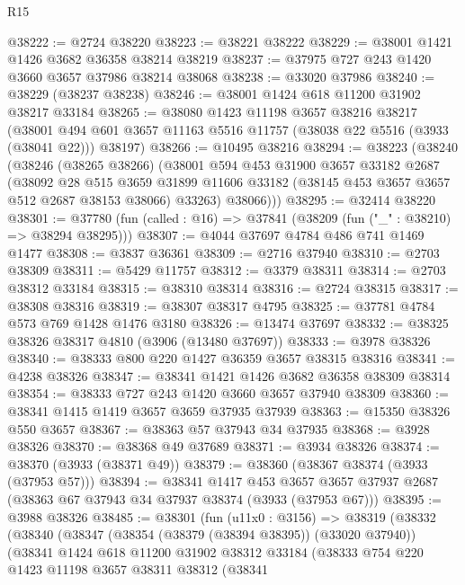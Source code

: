 \begin{lexlean}{R15}
\begin{coremodule}
@38222 := @2724 @38220
@38223 := @38221 @38222
@38229 := @38001 @1421 @1426 @3682 @36358 @38214 @38219
@38237 := @37975 @727 @243 @1420 @3660 @3657 @37986 @38214 @38068
@38238 := @33020 @37986
@38240 := @38229 (@38237 @38238)
@38246 := @38001 @1424 @618 @11200 @31902 @38217 @33184
@38265 := @38080
    @1423
    @11198
    @3657
    @38216
    @38217
    (@38001 @494 @601 @3657 @11163 @5516 @11757 (@38038 @22 @5516 (@3933 (@38041 @22))) @38197)
@38266 := @10495 @38216
@38294 := @38223
    (@38240
      (@38246
        (@38265 @38266)
        (@38001
          @594
          @453
          @31900
          @3657
          @33182
          @2687
          (@38092
            @28
            @515
            @3659
            @31899
            @11606
            @33182
            (@38145 @453 @3657 @3657 @512 @2687 @38153 @38066)
            @33263)
          @38066)))
@38295 := @32414 @38220
@38301 := @37780 (fun (called : @16) => @37841 (@38209 (fun ("_" : @38210) => @38294 @38295)))
@38307 := @4044 @37697 @4784 @486 @741 @1469 @1477
@38308 := @3837 @36361
@38309 := @2716 @37940
@38310 := @2703 @38309
@38311 := @5429 @11757
@38312 := @3379 @38311
@38314 := @2703 @38312 @33184
@38315 := @38310 @38314
@38316 := @2724 @38315
@38317 := @38308 @38316
@38319 := @38307 @38317 @4795
@38325 := @37781 @4784 @573 @769 @1428 @1476 @3180
@38326 := @13474 @37697
@38332 := @38325 @38326 @38317 @4810 (@3906 (@13480 @37697))
@38333 := @3978 @38326
@38340 := @38333 @800 @220 @1427 @36359 @3657 @38315 @38316
@38341 := @4238 @38326
@38347 := @38341 @1421 @1426 @3682 @36358 @38309 @38314
@38354 := @38333 @727 @243 @1420 @3660 @3657 @37940 @38309
@38360 := @38341 @1415 @1419 @3657 @3659 @37935 @37939
@38363 := @15350 @38326 @550 @3657
@38367 := @38363 @57 @37943 @34 @37935
@38368 := @3928 @38326
@38370 := @38368 @49 @37689
@38371 := @3934 @38326
@38374 := @38370 (@3933 (@38371 @49))
@38379 := @38360 (@38367 @38374 (@3933 (@37953 @57)))
@38394 := @38341
    @1417
    @453
    @3657
    @3657
    @37937
    @2687
    (@38363 @67 @37943 @34 @37937 @38374 (@3933 (@37953 @67)))
@38395 := @3988 @38326
@38485 := @38301
    (fun (u11x0 : @3156) =>
    @38319
      (@38332
        (@38340
          (@38347
            (@38354 (@38379 (@38394 @38395)) (@33020 @37940))
            (@38341
              @1424
              @618
              @11200
              @31902
              @38312
              @33184
              (@38333
                @754
                @220
                @1423
                @11198
                @3657
                @38311
                @38312
                (@38341

\end{coremodule}
\end{lexlean}
